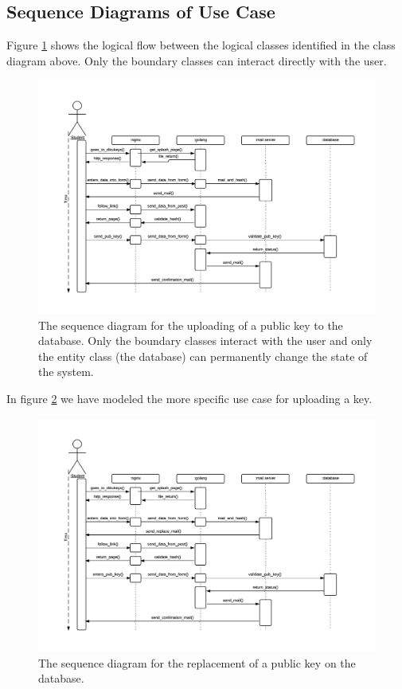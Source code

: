 \documentclass[11pt,a4paper]{report}
\begin{document}
\subsection{Sequence Diagrams of Use Case}\label{subsec:Sequence_diagram_Use_case_model}
Figure \ref{fig:sequence_diagram} shows the logical flow between the logical classes identified in the class diagram above. Only the boundary classes can interact directly with the user.
\begin{figure}[H]
    \centering
    \includegraphics[width=\textwidth]{pictures/sequence_diagram_upload}
    \caption{The sequence diagram for the uploading of a public key to the database. Only the boundary classes interact with the user and only the entity class (the database) can permanently change the state of the system.}
    \label{fig:sequence_diagram}
\end{figure}

In figure \ref{fig:use_case_diagram_example_two} we have modeled the more specific use case for uploading a key.

\begin{figure}[H]
    \centering
    \includegraphics[width=\textwidth]{pictures/sequence_diagram_replace}
     \caption{The sequence diagram for the replacement of a public key on the database.}
    \label{fig:use_case_diagram_example_two}
\end{figure}
\end{document}
